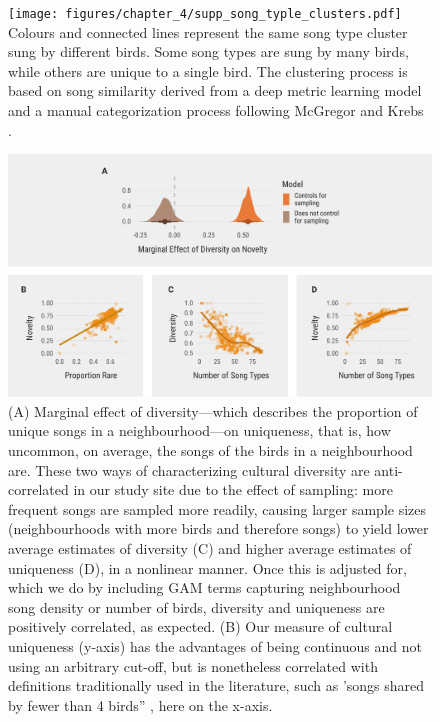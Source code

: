 \documentclass[9pt, onecolumn, twoside, lineno]{gsajnl}
\begin{document}
\begin{figure}[tbp]
    \centering
    \texttt{[image: figures/chapter\_4/supp\_song\_typle\_clusters.pdf]}
    {
Colours and connected lines represent the same song type cluster sung by different birds. Some song types are sung by many birds, while others are unique to a single bird. The clustering process is based on song similarity derived from a deep metric learning model and a manual categorization process following McGregor and Krebs \autocite{mcgregor1982b}.
    }
    \label{fig:supp_song_typle_clusters}
\end{figure}


\begin{figure}[tbp]
    \centering
    \includegraphics[width=\linewidth]{figures/chapter_4/supp_song_sampling.pdf}
    {
        (A) Marginal effect of diversity---which describes the proportion of unique songs in a neighbourhood---on uniqueness, that is, how uncommon, on average, the songs of the birds in a neighbourhood are. These two ways of characterizing cultural diversity are anti-correlated in our study site due to the effect of sampling: more frequent songs are sampled more readily, causing larger sample sizes (neighbourhoods with more birds and therefore songs) to yield lower average estimates of diversity (C) and higher average estimates of uniqueness (D), in a nonlinear manner. Once this is adjusted for, which we do by including GAM terms capturing neighbourhood song density or number of birds, diversity and uniqueness are positively correlated, as expected. (B) Our measure of cultural uniqueness (y-axis) has the advantages of being continuous and not using an arbitrary cut-off, but is nonetheless correlated with definitions traditionally used in the literature, such as 'songs shared by fewer than 4 birds” \autocite{mcgregor1982b}, here on the x-axis.}
    \label{fig:supp_song_sampling}
\end{figure}
\end{document}
